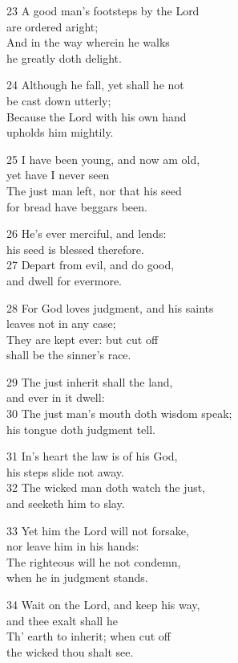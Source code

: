 \begin{multicols}{3}
23 A good man’s footsteps by the Lord\\
are ordered aright;\\
And in the way wherein he walks\\
he greatly doth delight.

24 Although he fall, yet shall he not\\
be cast down utterly;\\
Because the Lord with his own hand\\
upholds him mightily.

25 I have been young, and now am old,\\
yet have I never seen\\
The just man left, nor that his seed\\
for bread have beggars been.

26 He’s ever merciful, and lends:\\
his seed is blessed therefore.\\
27 Depart from evil, and do good,\\
and dwell for evermore.

28 For God loves judgment, and his saints\\
leaves not in any case;\\
They are kept ever: but cut off\\
shall be the sinner’s race.

29 The just inherit shall the land,\\
and ever in it dwell:\\
30 The just man’s mouth doth wisdom speak;\\
his tongue doth judgment tell.

31 In’s heart the law is of his God,\\
his steps slide not away.\\
32 The wicked man doth watch the just,\\
and seeketh him to slay.

33 Yet him the Lord will not forsake,\\
nor leave him in his hands:\\
The righteous will he not condemn,\\
when he in judgment stands.

34 Wait on the Lord, and keep his way,\\
and thee exalt shall he\\
Th’ earth to inherit; when cut off\\
the wicked thou shalt see.


\end{multicols}

